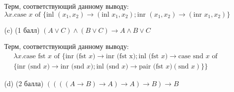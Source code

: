 \begin{enumerate}
\begin{itemize}
\begin{solution}
\begin{prooftree}
      \end{prooftree}
      Терм, соответствующий данному выводу:
      \begin{equation}
        \lambda x. \text{case } x \text{ of } \{\text{inl } (x_1, x_2) \rightarrow (\text{inl } x_1, x_2); \text{inr } (x_1, x_2) \rightarrow (\text{inr } x_1, x_2)\}
      \end{equation}
    \end{solution}
    \item[(c)] (1 балл) $(A \lor C) \land (B \lor C) \rightarrow A \land B \lor C$
    \begin{solution}
      \hspace{0.01cm}
      \begin{prooftree}
      \end{prooftree}
      Терм, соответствующий данному выводу:
      \begin{eqnarray}
        \lambda x. \text{case fst } x \text{ of } \{\text{inr (fst } x) \rightarrow \text{inr (fst x)}; \text{inl (fst } x) \rightarrow \text{case snd } x \text{ of } \\\{\text{inr (snd } x) \rightarrow \text{inr (snd } x);\text{inl (snd } x) \rightarrow \text{pair (fst } x) (\text{snd }x)\}\}
      \end{eqnarray}
    \end{solution}
    \item[(d)] (2 балла) $((((A \rightarrow B) \rightarrow A) \rightarrow A) \rightarrow B) \rightarrow B$
    \begin{solution}
      \hspace{0.01cm}

\end{solution}
\end{itemize}
\end{enumerate}
